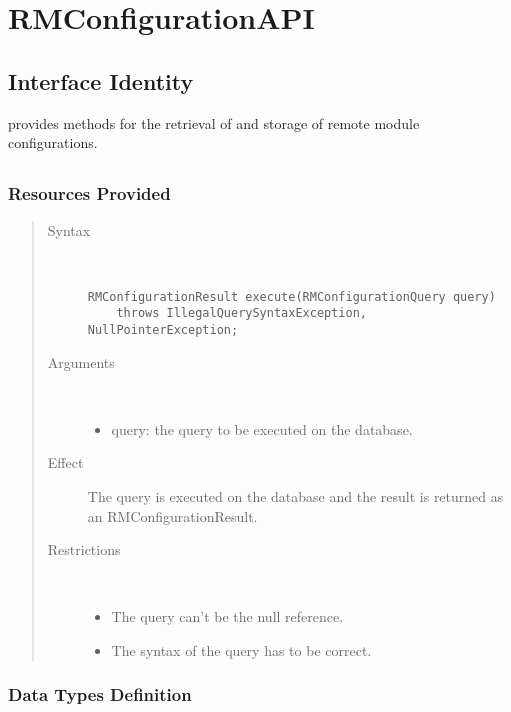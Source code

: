 \section{RMConfigurationAPI}
\label{api:rm-configuration-api}

\subsection{Interface Identity}

\npar {} provides methods for the retrieval of and
storage of remote module configurations.

\subsection{}

\subsubsection{Resources Provided}

\begin{quote}
	\begin{description}
		\item[Syntax] \
		\begin{verbatim}
RMConfigurationResult execute(RMConfigurationQuery query)
    throws IllegalQuerySyntaxException, NullPointerException;
		\end{verbatim}
		\item[Arguments] \
		\begin{itemize}
		  \item query: the query to be executed on the database. 
		\end{itemize}
		\item[Effect] The query is executed on the database and the result is returned
		as an RMConfigurationResult. 
		\item[Restrictions] \
		\begin{itemize}
		  \item The query can't be the null reference.
		  \item The syntax of the query has to be correct.
		\end{itemize}
	\end{description} 
\end{quote}

\subsubsection{Data Types Definition}

